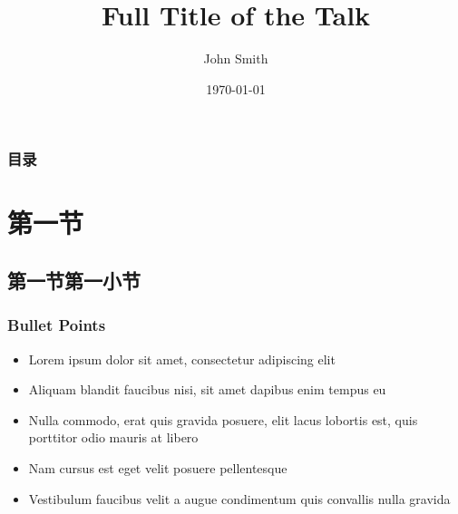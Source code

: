 \documentclass[12pt]{beamer}
\title[Short title]{Full Title of the Talk} %
\author{John Smith} %
\institute[UCLA] %
{
University of California \\ %
\medskip
\textit{john@smith.com} %
}
\date{\today} %
\numberwithin{thm}{section}
\numberwithin{defn}{section}
\numberwithin{lmm}{section}
\theoremstyle{example}
\numberwithin{figure}{section}
\numberwithin{table}{section}
\numberwithin{equation}{section}
\begin{document}
\maketitle


\begin{frame}\frametitle{目录}
\tableofcontents
\end{frame}




\section{第一节} %

\subsection{第一节第一小节} %


\begin{frame}
\frametitle{Bullet Points}
\begin{itemize}
\item Lorem ipsum dolor sit amet, consectetur adipiscing elit
\item Aliquam blandit faucibus nisi, sit amet dapibus enim tempus eu
\item Nulla commodo, erat quis gravida posuere, elit lacus lobortis est, quis porttitor odio mauris at libero
\item Nam cursus est eget velit posuere pellentesque
\item Vestibulum faucibus velit a augue condimentum quis convallis nulla gravida
\end{itemize}
\end{frame}

\end{document}
